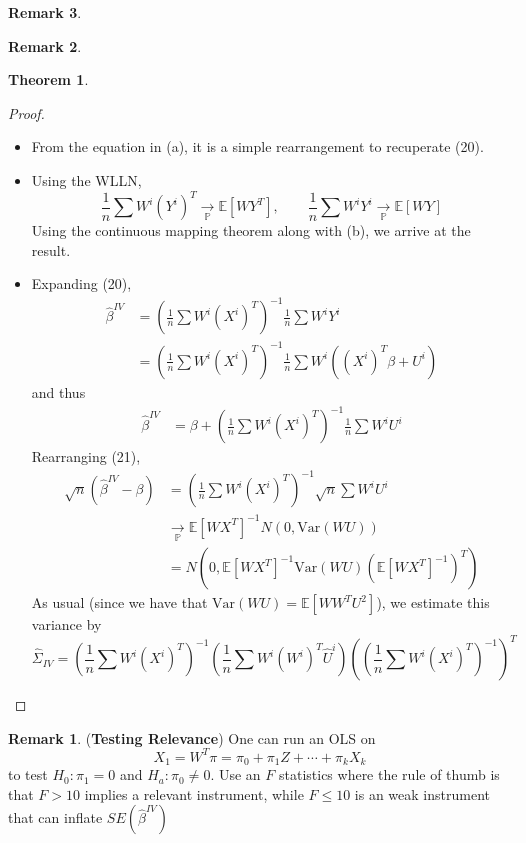 \documentclass[10pt, oneside]{article}
\newcommand{\bbP}{\mathbb{P}}
\newcommand{\Var}{\text{Var}}
\newcommand{\bbE}{\mathbb{E}}
\theoremstyle{definition}
\newtheorem{thm}{Theorem}
\newtheorem{rem}{Remark}
\begin{document}
\begin{rem}
\begin{rem}
\begin{thm}
\end{thm}
\begin{proof}
    \begin{itemize}
        \item From the equation in (a), it is a simple rearrangement to recuperate (20).
        \item Using the WLLN, 
        \[\frac{1}{n}\sum W^i(Y^i)^T \xrightarrow[\bbP]{}\bbE[WY^T], \qquad \frac{1}{n}\sum W^i Y^i \xrightarrow[\bbP]{}\bbE[WY]\] Using the continuous mapping theorem along with (b), we arrive at the result.
        \item Expanding (20), 
        \begin{align*}
            \hat\beta^{IV} &= \left(\frac{1}{n}\sum W^i (X^i)^T\right)^{-1} \frac{1}{n}\sum W^iY^i\\
            &= \left(\frac{1}{n}\sum W^i (X^i)^T\right)^{-1} \frac{1}{n}\sum W^i((X^i)^T\beta + U^i)
        \end{align*}
        and thus 
        \begin{align}
            \hat\beta^{IV}&= \beta + \left(\frac{1}{n}\sum W^i (X^i)^T\right)^{-1} \frac{1}{n}\sum W^iU^i
        \end{align}
        Rearranging (21),
        \begin{align*}
            \sqrt{n}(\hat\beta^{IV} - \beta) 
            &=  \left(\frac{1}{n}\sum W^i (X^i)^T\right)^{-1} \sqrt{n}\sum W^iU^i\\
            &\xrightarrow[\bbP]{} \bbE[WX^T]^{-1} N(0,\Var(WU))\\
            &= N(0, \bbE[WX^T]^{-1}\Var(WU)(\bbE[WX^T]^{-1})^T)
        \end{align*}
        As usual (since we have that $\Var(WU) = \bbE[WW^T U^2]$), we estimate this variance by 
        \[\hat\Sigma_{IV} = \left(\frac{1}{n}\sum W^i (X^i)^T \right)^{-1}\left(\frac{1}{n}\sum W^i(W^i)^T\hat U^i\right)\left(\left(\frac{1}{n}\sum W^i (X^i)^T\right)^{-1}\right)^T\]
    \end{itemize}
\end{proof}
\begin{rem}
    (\textbf{Testing Relevance}) One can run an OLS on 
    \[X_1 = W^T \pi = \pi_0 + \pi_1 Z +\cdots + \pi_k X_k\] to test $H_0: \pi_1 = 0$ and $H_a: \pi_0 \neq 0.$ Use an $F$ statistics where the rule of thumb is that $F >10$ implies a relevant instrument, while $F\leq 10$ is an weak instrument that can inflate $SE(\hat\beta^{IV})$
\end{rem}


\end{rem}
\end{rem}
\end{document}
